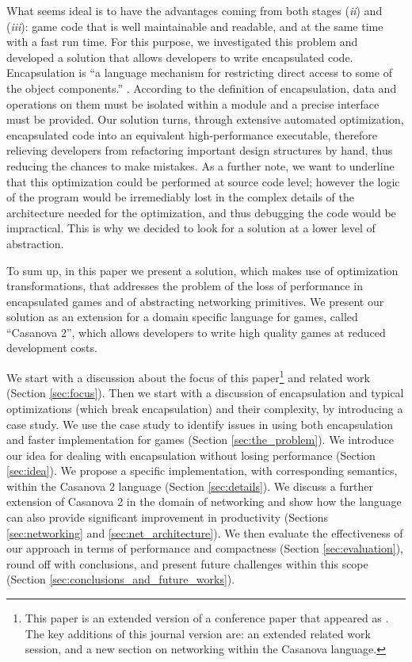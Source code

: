 What seems ideal is to have the advantages coming from both stages (\textit{ii}) and (\textit{iii}): game code that is well maintainable and readable, and at the same time with a fast run time. For this purpose, we investigated this problem and developed a solution that allows developers to write encapsulated code. Encapsulation is ``a language mechanism for restricting direct access to some of the object components.'' \cite{mitchell2003concepts}. According to the definition of encapsulation, data and operations on them must be isolated within a module and a precise interface must be provided. Our solution turns, through extensive automated optimization, encapsulated code into an equivalent high-performance executable, therefore relieving developers from refactoring important design structures by hand, thus reducing the chances to make mistakes. As a further note, we want to underline that this optimization could be performed at source code level; however the logic of the program would be irremediably lost in the complex details of the architecture needed for the optimization, and thus debugging the code would be impractical. This is why we decided to look for a solution at a lower level of abstraction.


To sum up, in this paper we present a solution, which makes use of optimization transformations, that addresses the problem of the loss of performance in encapsulated games and of abstracting networking primitives. We present our solution as an extension for a domain specific language for games, called ``Casanova 2'', which allows developers to write high quality games at reduced development costs. 

We start with a discussion about the focus of this paper\footnote{This paper is an extended version of a conference paper that appeared as \cite{abbadi2015high}. The key additions of this journal version are: an extended related work session, and a new section on networking within the Casanova language.} and related work (Section \ref{sec:focus}). Then we start with a discussion of encapsulation and typical optimizations (which break encapsulation) and their complexity, by introducing a case study. We use the case study to identify issues in using both encapsulation and faster implementation for games (Section \ref{sec:the_problem}). We introduce our idea for dealing with encapsulation without losing performance (Section \ref{sec:idea}). We propose a specific implementation, with corresponding semantics, within the Casanova 2 language (Section \ref{sec:details}). We discuss a further extension of Casanova 2 in the domain of networking and show how the language can also provide significant improvement in productivity (Sections \ref{sec:networking} and \ref{sec:net_architecture}). We then evaluate the effectiveness of our approach in terms of performance and compactness (Section \ref{sec:evaluation}), round off with conclusions, and present future challenges within this scope (Section \ref{sec:conclusions_and_future_works}).

